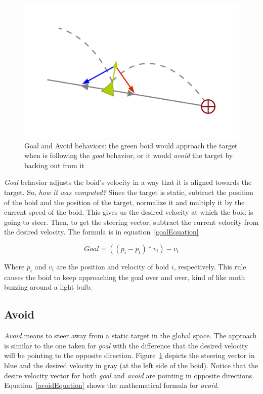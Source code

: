 \begin{figure}[htbp]
\begin{center}
\includegraphics[scale=0.5]{figures/seekANDflee.pdf}
\caption{Goal and Avoid behaviors: the green boid would approach the target when is following the \textit{goal} behavior, or it would \textit{avoid} the target by backing out from it}
\label{seekfleePDF}
\end{center}
\end{figure}

\textit{Goal} behavior adjusts the boid's velocity in a way that it is aligned towards the target. So, \textit{how it was computed?} Since the target is static, subtract the position of the boid and the position of the target, normalize it and multiply it by the current speed of the boid. This gives us the desired velocity at which the boid is going to steer. Then, to get the steering vector, subtract the current velocity from the desired velocity. The formula is in equation~\ref{goalEquation}

\begin{equation}
\label{goalEquation}
Goal = ((p_i - p_t) * v_i) - v_i
\end{equation}

Where $p_i$ and $v_i$ are the position and velocity of boid $i$, respectively. This rule causes the boid to keep approaching the goal over and over, kind of like moth buzzing around a light bulb.

\subsection{Avoid}
\textit{Avoid} means to steer away from a static target in the global space. The approach is similar to the one taken for \textit{goal} with the difference that the desired velocity will be pointing to the opposite direction. Figure~\ref{seekfleePDF} depicts the steering vector in blue and the desired velocity in gray (at the left side of the boid). Notice that the desire velocity vector for both \textit{goal} and \textit{avoid} are pointing in opposite directions. Equation~\ref{avoidEquation} shows the mathematical formula for \textit{avoid}.

